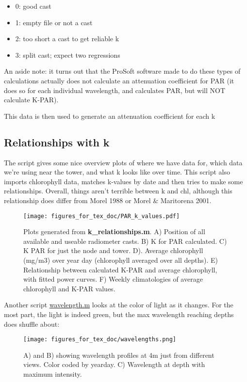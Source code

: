 \documentclass[11pt]{article}
\begin{document}
\begin{itemize}
\item 0: good cast
\item 1: empty file or not a cast
\item 2: too short a cast to get reliable k
\item 3: split cast; expect two regressions
\end{itemize}

\noindent An aside note: it turns out that the ProSoft software made to do these types of calculations actually does not calculate an attenuation coefficient for PAR (it does so for each individual wavelength, and calculates PAR, but will NOT calculate K-PAR). 

This data is then used to generate an attenuation coefficient for each k 



\subsection{Relationships with k}

The script  gives some nice overview plots of where we have data for, which data we're using near the tower, and what k looks like over time. This script also imports chlorophyll data, matches k-values by date and then tries to make some relationships. Overall, things aren't terrible between k and chl, although this relationship does differ from Morel 1988 or Morel \& Maritorena 2001.

 
 \begin{figure}[h]
\centering
\texttt{[image: figures\_for\_tex\_doc/PAR\_k\_values.pdf]}
\caption{Plots generated from \textbf{k\_relationships.m}. A) Position of all available and useable radiometer casts. B) K for PAR calculated. C) K PAR for just the node and tower. D). Average chlorophyll (mg/m3) over year day (chlorophyll averaged over all depths). E) Relationship between calculated K-PAR and average chlorophyll, with fitted power curves. F) Weekly climatologies of average chlorophyll and K-PAR values.}
\end{figure}

\clearpage

Another script \url{wavelength.m} looks at the color of light as it changes. For the most part, the light is indeed green, but the max wavelength reaching depths does shuffle about:
 \begin{figure}[h]
\centering
\texttt{[image: figures\_for\_tex\_doc/wavelengths.png]}
\caption{A) and B) showing wavelength profiles at 4m just from different views. Color coded by yearday. C) Wavelength at depth with maximum intensity.}
\end{figure}
\end{document}
